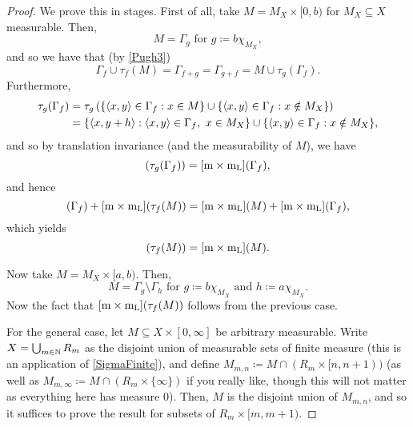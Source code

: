 \begin{thm}[Integral]
\begin{proof}
We prove this in stages.  First of all, take $M=M_X\times [0,b)$ for $M_X\subseteq X$ measurable.  Then,
\begin{equation}
M=\Gamma _g\text{ for }g\coloneqq b\chi _{M_X},
\end{equation}
and so we have that (by \eqref{Pugh3})
\begin{equation}
\Gamma _f\cup \tau _f(M)=\Gamma _{f+g}=\Gamma _{g+f}=M\cup \tau _g(\Gamma _f).
\end{equation}
Furthermore,
\begin{equation}
\begin{split}
\tau _g(\Gamma _f) & =\tau _g\left( \{ \langle x,y\rangle\in \Gamma _f:x\in M\} \cup \{ \langle x,y\rangle\in \Gamma _f:x\notin M_X\} \right) \\
& =\{ \langle x,y+h\rangle:\langle x,y\rangle\in \Gamma _f,\ x\in M_X\} \cup \{ \langle x,y\rangle\in \Gamma _f:x\notin M_X\} ,
\end{split}
\end{equation}
and so by translation invariance (and the measurability of $M$), we have
\begin{equation}
[\meas \times \meas _{\mathrm{L}}](\tau _g(\Gamma _f))=[\meas \times \meas _{\mathrm{L}}](\Gamma _f),
\end{equation}
and hence
\begin{equation}
[\meas \times \meas _{\mathrm{L}}](\Gamma _f)+[\meas \times \meas _{\mathrm{L}}](\tau _f(M))=[\meas \times \meas _{\mathrm{L}}](M)+[\meas \times \meas _{\mathrm{L}}](\Gamma _f),
\end{equation}
which yields
\begin{equation}
[\meas \times \meas _{\mathrm{L}}](\tau _f(M))=[\meas \times \meas _{\mathrm{L}}](M).
\end{equation}

Now take $M=M_X\times [a,b)$.  Then,
\begin{equation}
M=\Gamma _g\setminus \Gamma _h\text{ for }g\coloneqq b\chi _{M_X}\text{ and }h\coloneqq a\chi _{M_X}.
\end{equation}
Now the fact that $[\mathrm{m} \times \mathrm{m} _{\mathrm{L}}](\tau _f(M))$ follows from the previous case.

For the general case, let $M\subseteq X\times [0,\infty ]$ be arbitrary measurable.  Write $X=\bigcup _{m\in \mathbb{N}}R_m$ as the disjoint union of measurable sets of finite measure (this is an application of \cref{SigmaFinite}), and define $M_{m,n}\coloneqq M\cap (R_m\times [n,n+1))$ (as well as $M_{m,\infty}\coloneqq M\cap (R_m\times \{ \infty \} )$ if you really like, though this will not matter as everything here has measure $0$).  Then, $M$ is the disjoint union of $M_{m,n}$, and so it suffices to prove the result for subsets of $R_m\times [m,m+1)$.


\end{proof}
\end{thm}
